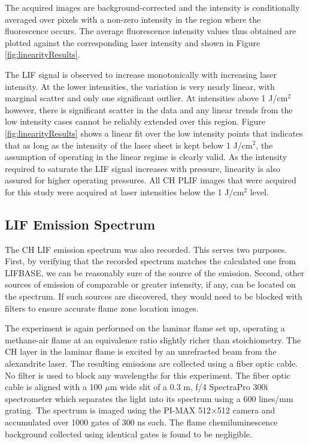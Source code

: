 The acquired images are background-corrected and the intensity is conditionally averaged over pixels with a non-zero intensity in the region where the fluorescence occurs.
The average fluorescence intensity values thus obtained are plotted against the corresponding laser intensity and shown in Figure \ref{fig:linearityResults}.



The LIF signal is observed to increase monotonically with increasing laser intensity.
At the lower intensities, the variation is very nearly linear, with marginal scatter and only one significant outlier.
At intensities above 1 J/cm\(^2\) however, there is significant scatter in the data and any linear trends from the low intensity cases cannot be reliably extended over this region.
Figure \ref{fig:linearityResults} shows a linear fit over the low intensity points that indicates that as long as the intensity of the laser sheet is kept below 1 J/cm\(^2\), the assumption of operating in the linear regime is clearly valid. As the intensity required to saturate the LIF signal increases with pressure, linearity is also assured for higher operating pressures. 
All CH PLIF images that were acquired for this study were acquired at laser intensities below the 1 J/cm\(^2\) level.

\subsection{LIF Emission Spectrum}

The CH LIF emission spectrum was also recorded.
This serves two purposes.
First, by verifying that the recorded spectrum matches the calculated one from LIFBASE, we can be reasonably sure of the source of the emission.
Second, other sources of emission of comparable or greater intensity, if any, can be located on the spectrum.
If such sources are discovered, they would need to be blocked with filters to ensure accurate flame zone location images.

The experiment is again performed on the laminar flame set up, operating a methane-air flame at an equivalence ratio slightly richer than stoichiometry.
The CH layer in the laminar flame is excited by an unrefracted beam from the alexandrite laser.
The resulting emissions are collected using a fiber optic cable.
No filter is used to block any wavelengths for this experiment.
The fiber optic cable is aligned with a 100 \(\mu\)m wide slit of a 0.3 m, f/4 SpectraPro 300i spectrometer which separates the light into its spectrum using a 600 lines/mm grating.
The spectrum is imaged using the PI-MAX 512\(\times\)512 camera and accumulated over 1000 gates of 300 ns each.
The flame chemiluminescence background collected using identical gates is found to be negligible.

